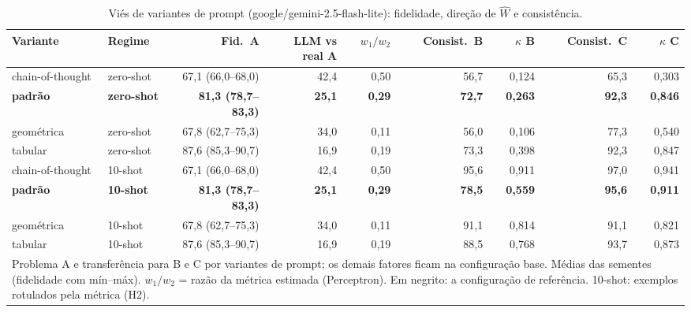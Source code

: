 \begin{table}[htbp]
\centering
\small
\caption{Viés de variantes de prompt (google/gemini-2.5-flash-lite): fidelidade, direção de $\hat{W}$ e consistência.}
\label{tab:bloco1_vies_variantes_prompt_flashlite}
\begin{tabular}{llrrrrrrr}
\toprule
Variante & Regime & Fid.\ A & LLM vs real A & $w_1/w_2$ & Consist.\ B & $\kappa$ B & Consist.\ C & $\kappa$ C \\
\midrule
chain-of-thought & zero-shot & 67,1 (66,0–68,0) & 42,4 & 0,50 & 56,7 & 0,124 & 65,3 & 0,303 \\
\textbf{padrão} & \textbf{zero-shot} & \textbf{81,3 (78,7–83,3)} & \textbf{25,1} & \textbf{0,29} & \textbf{72,7} & \textbf{0,263} & \textbf{92,3} & \textbf{0,846} \\
geométrica & zero-shot & 67,8 (62,7–75,3) & 34,0 & 0,11 & 56,0 & 0,106 & 77,3 & 0,540 \\
tabular & zero-shot & 87,6 (85,3–90,7) & 16,9 & 0,19 & 73,3 & 0,398 & 92,3 & 0,847 \\
\midrule
chain-of-thought & 10-shot & 67,1 (66,0–68,0) & 42,4 & 0,50 & 95,6 & 0,911 & 97,0 & 0,941 \\
\textbf{padrão} & \textbf{10-shot} & \textbf{81,3 (78,7–83,3)} & \textbf{25,1} & \textbf{0,29} & \textbf{78,5} & \textbf{0,559} & \textbf{95,6} & \textbf{0,911} \\
geométrica & 10-shot & 67,8 (62,7–75,3) & 34,0 & 0,11 & 91,1 & 0,814 & 91,1 & 0,821 \\
tabular & 10-shot & 87,6 (85,3–90,7) & 16,9 & 0,19 & 88,5 & 0,768 & 93,7 & 0,873 \\
\bottomrule
\multicolumn{9}{p{0.95\linewidth}}{\footnotesize Problema A e transferência para B e C por variantes de prompt; os demais fatores ficam na configuração base. Médias das sementes (fidelidade com mín–máx). $w_1/w_2$ = razão da métrica estimada (Perceptron). Em negrito: a configuração de referência. 10-shot: exemplos rotulados pela métrica (H2).} \\
\end{tabular}
\end{table}
